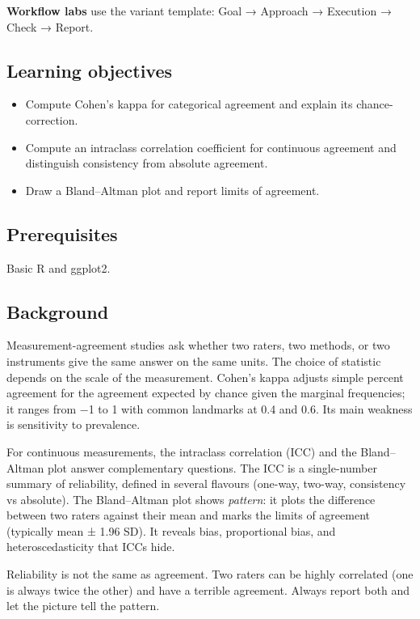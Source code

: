 \documentclass[
]{article}
\author{}
\date{\vspace{-2.5em}}
\providecommand{\tightlist}{%
  \setlength{\itemsep}{0pt}\setlength{\parskip}{0pt}}
\begin{document}
\textbf{Workflow labs} use the variant template: Goal → Approach →
Execution → Check → Report.

\subsection{Learning objectives}\label{learning-objectives}

\begin{itemize}
\tightlist
\item
  Compute Cohen's kappa for categorical agreement and explain its
  chance-correction.
\item
  Compute an intraclass correlation coefficient for continuous agreement
  and distinguish consistency from absolute agreement.
\item
  Draw a Bland--Altman plot and report limits of agreement.
\end{itemize}

\subsection{Prerequisites}\label{prerequisites}

Basic R and ggplot2.

\subsection{Background}\label{background}

Measurement-agreement studies ask whether two raters, two methods, or
two instruments give the same answer on the same units. The choice of
statistic depends on the scale of the measurement. Cohen's kappa adjusts
simple percent agreement for the agreement expected by chance given the
marginal frequencies; it ranges from −1 to 1 with common landmarks at
0.4 and 0.6. Its main weakness is sensitivity to prevalence.

For continuous measurements, the intraclass correlation (ICC) and the
Bland--Altman plot answer complementary questions. The ICC is a
single-number summary of reliability, defined in several flavours
(one-way, two-way, consistency vs absolute). The Bland--Altman plot
shows \emph{pattern}: it plots the difference between two raters against
their mean and marks the limits of agreement (typically mean ± 1.96 SD).
It reveals bias, proportional bias, and heteroscedasticity that ICCs
hide.

Reliability is not the same as agreement. Two raters can be highly
correlated (one is always twice the other) and have a terrible
agreement. Always report both and let the picture tell the pattern.
\end{document}
